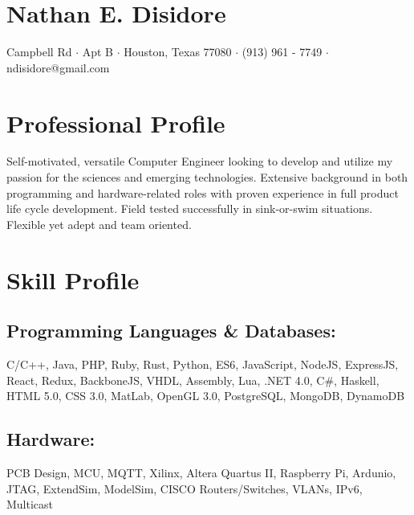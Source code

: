 \documentclass[10pt]{article}
\newcommand{\startsquarepar}{\par\begingroup \parfillskip 0pt \relax}
\newcommand{\stopsquarepar}{\par\endgroup}
\begin{document}
\pagestyle{empty} %

\section*{\Huge Nathan E. Disidore}
\startsquarepar
  9409 Campbell Rd $\cdot$ Apt B $\cdot$ Houston, Texas 77080 $\cdot$ (913) 961 - 7749 $\cdot$ ndisidore@gmail.com
\stopsquarepar

\section*{Professional Profile}
Self-motivated, versatile Computer Engineer looking to develop and utilize my passion for the sciences and emerging technologies. Extensive background in both programming and hardware-related roles with proven experience in full product life cycle development. Field tested successfully in sink-or-swim situations. Flexible yet adept and team oriented.

\section*{Skill Profile}
\subsection*{Programming Languages \& Databases:}
C/C++, Java, PHP, Ruby, Rust, Python, ES6, JavaScript, NodeJS, ExpressJS, React, Redux, BackboneJS, VHDL, Assembly, Lua, .NET 4.0, C\#, Haskell, HTML 5.0, CSS 3.0, MatLab, OpenGL 3.0, PostgreSQL, MongoDB, DynamoDB
\subsection*{Hardware:}
PCB Design, MCU, MQTT, Xilinx, Altera Quartus II, Raspberry Pi, Ardunio, JTAG, ExtendSim, ModelSim, CISCO Routers/Switches, VLANs, IPv6, Multicast
\end{document}
